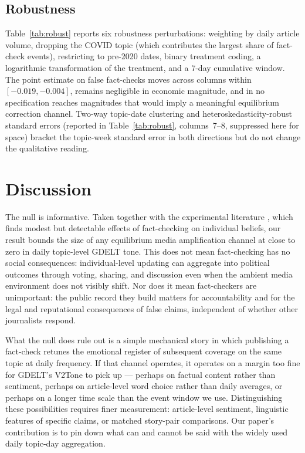 \documentclass[12pt]{article}
\begin{document}


\subsection{Robustness}

Table~\ref{tab:robust} reports six robustness perturbations: weighting by daily article volume, dropping the COVID topic (which contributes the largest share of fact-check events), restricting to pre-2020 dates, binary treatment coding, a logarithmic transformation of the treatment, and a $7$-day cumulative window. The point estimate on false fact-checks moves across columns within $[-0.019, -0.004]$, remains negligible in economic magnitude, and in no specification reaches magnitudes that would imply a meaningful equilibrium correction channel. Two-way topic-date clustering and heteroskedasticity-robust standard errors (reported in Table~\ref{tab:robust}, columns~7--8, suppressed here for space) bracket the topic-week standard error in both directions but do not change the qualitative reading.



\section{Discussion}

The null is informative. Taken together with the experimental literature \citep{nyhan2010,walter2020,guess2020digital}, which finds modest but detectable effects of fact-checking on individual beliefs, our result bounds the size of any equilibrium media amplification channel at close to zero in daily topic-level GDELT tone. This does not mean fact-checking has no social consequences: individual-level updating can aggregate into political outcomes through voting, sharing, and discussion even when the ambient media environment does not visibly shift. Nor does it mean fact-checkers are unimportant: the public record they build matters for accountability and for the legal and reputational consequences of false claims, independent of whether other journalists respond.

What the null does rule out is a simple mechanical story in which publishing a fact-check retunes the emotional register of subsequent coverage on the same topic at daily frequency. If that channel operates, it operates on a margin too fine for GDELT's V2Tone to pick up --- perhaps on factual content rather than sentiment, perhaps on article-level word choice rather than daily averages, or perhaps on a longer time scale than the event window we use. Distinguishing these possibilities requires finer measurement: article-level sentiment, linguistic features of specific claims, or matched story-pair comparisons. Our paper's contribution is to pin down what can and cannot be said with the widely used daily topic-day aggregation.
\end{document}
